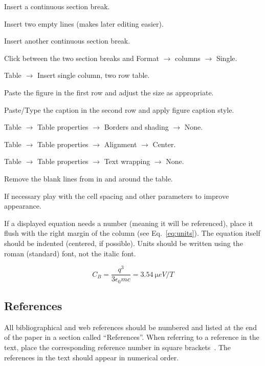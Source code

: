 \documentclass[acus]{jacow}
\begin{document}
\begin{Itemize}
\item	Insert a continuous section break.
\item	Insert two empty lines (makes later editing easier).
\item	Insert another continuous section break.
\item	Click between the two section breaks and Format $\rightarrow$ columns $\rightarrow$ Single.
\item	Table $\rightarrow$ Insert single column, two row table.
\item	Paste the figure in the first row and adjust the size as appropriate.
\item	Paste/Type the caption in the second row and apply figure caption style.
\item	Table $\rightarrow$ Table properties $\rightarrow$ Borders and shading $\rightarrow$ None.
\item	Table $\rightarrow$ Table properties $\rightarrow$ Alignment $\rightarrow$ Center.
\item	Table $\rightarrow$ Table properties $\rightarrow$ Text wrapping $\rightarrow$ None.
\item	Remove the blank lines from in and around the table.
\item	If necessary play with the cell spacing and other parameters to improve appearance.
\end{Itemize}

If a displayed equation needs a number (meaning it will be referenced), place it flush with the right
margin of the column (see Eq.~\ref{eq:units}). The equation itself should be indented (centered, if possible).
Units should be written
using the roman (standard) font, not the italic font.

\begin{equation}\label{eq:units}
    C_B=\frac{q^3}{3\epsilon_{0} mc}=\SI{3.54}{\micro eV/T}
\end{equation}

\subsection{References}

All bibliographical and web references should be numbered and listed at the
end of the paper in a section called \enquote{References}. When referring to a
reference in the text, place the corresponding reference number in square
brackets~\cite{exampl-ref}. The references in the text should appear in numerical
order.
\end{document}
